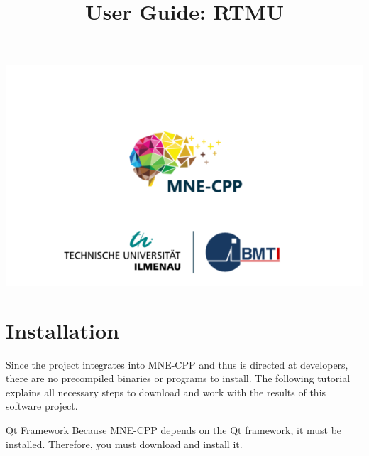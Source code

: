 



	
\title{User Guide: RTMU}
\vspace{3 in}
\maketitle

\includegraphics[width = \linewidth]{figures/mne-cpp.png}

\clearpage


\tableofcontents

\clearpage


\section{Installation}

Since the project integrates into MNE-CPP and thus is directed at developers, there are no precompiled binaries or programs to install. The following tutorial explains all necessary steps to download and work with the results of this software project.

\begin{aims}
	\item[\hspace*{11mm} Qt Framework] Because MNE-CPP depends on the Qt framework, it must be installed. Therefore, you must download and install it.
\end{aims}

